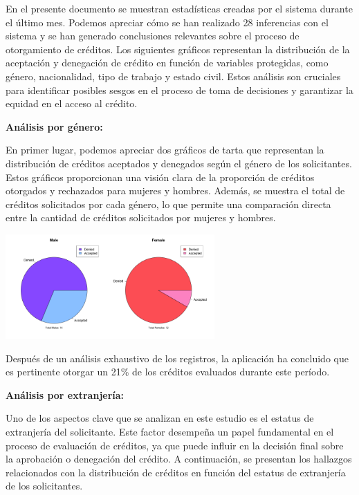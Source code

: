 \documentclass{article}
\begin{document}
\begin{multicols}{2}

En el presente documento se muestran estadísticas creadas por el sistema durante el último mes. Podemos apreciar cómo se han realizado {\huge 28 inferencias} con el sistema y se han generado conclusiones relevantes sobre el proceso de otorgamiento de créditos. Los siguientes gráficos representan la distribución de la aceptación y denegación de crédito en función de variables protegidas, como género, nacionalidad, tipo de trabajo y estado civil. Estos análisis son cruciales para identificar posibles sesgos en el proceso de toma de decisiones y garantizar la equidad en el acceso al crédito.

\vspace{0.5cm}
\textbf{Análisis por género:}

En primer lugar, podemos apreciar dos gráficos de tarta que representan la distribución de créditos aceptados y denegados según el género de los solicitantes. Estos gráficos proporcionan una visión clara de la proporción de créditos otorgados y rechazados para mujeres y hombres. Además, se muestra el total de créditos solicitados por cada género, lo que permite una comparación directa entre la cantidad de créditos solicitados por mujeres y hombres.

\begin{center} %
    \includegraphics[width=8cm]{tex/media/gender.png} 
\end{center}

Después de un análisis exhaustivo de los registros, la aplicación ha concluido que es pertinente {\huge otorgar un 21\%} de los créditos evaluados durante este período.

\vspace{0.5cm}
\textbf{Análisis por extranjería:}

Uno de los aspectos clave que se analizan en este estudio es el estatus de extranjería del solicitante. Este factor desempeña un papel fundamental en el proceso de evaluación de créditos, ya que puede influir en la decisión final sobre la aprobación o denegación del crédito. A continuación, se presentan los hallazgos relacionados con la distribución de créditos en función del estatus de extranjería de los solicitantes.



\end{multicols}
\end{document}
